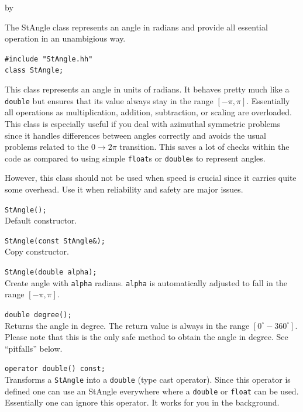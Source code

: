 \documentclass[twoside]{article}
\newcommand{\entrylabel}[1]{\mbox{\textbf{{#1}}}\hfil}%
\newenvironment{entry}
{\begin{list}{}%
    {\renewcommand{\makelabel}{\entrylabel}%
     \setlength{\labelwidth}{90pt}%
     \setlength{\leftmargin}{\labelwidth}
     \advance\leftmargin by \labelsep%
      }%
    }%
  {\end{list}}
\newcommand{\Entrylabel}[1]%
{\raisebox{0pt}[1ex][0pt]{\makebox[\labelwidth][l]%
    {\parbox[t]{\labelwidth}{\hspace{0pt}\textbf{{#1}}}}}}
\newenvironment{Entry}%
{\renewcommand{\entrylabel}{\Entrylabel}\begin{entry}}%
  {\end{entry}}
\begin{document}
\begin{Entry}
\item[Summary]
     The StAngle class represents an angle in radians and provide
     all essential operation in an unambigious way.
     
\item[Synopsis]
  \verb+#include "StAngle.hh"+ \\
  \verb+class StAngle;+\\
    
\item[Description]   
  This class represents an angle in units of radians. It behaves
  pretty much like a \texttt{double} but ensures that its value
  always stay in the range $[-\pi, \pi]$. Essentially all operations
  as multiplication, addition, subtraction, or scaling are overloaded.
  This class is especially useful if you deal with azimuthal symmetric
  problems since it handles differences between angles correctly and avoids
  the usual problems related to the $0 \rightarrow 2 \pi$ transition.
  This saves a lot of checks within the code as compared to using
  simple \texttt{float}s or \texttt{double}s to represent angles.

  However, this class should not be used when speed is crucial since
  it carries quite some overhead. Use it when reliability and safety
  are major issues.

\item[Public\\ Constructors]
    \verb+StAngle();+\\
    Default constructor. 
    
    \verb+StAngle(const StAngle&);+\\
    Copy constructor. 
    
    \verb+StAngle(double alpha);+\\
    Create angle with \texttt{alpha} radians. \texttt{alpha} is automatically
    adjusted to fall in the range $[-\pi, \pi]$.

    
\item[Public Member\\ Functions]
    \verb+double degree();+\\
    Returns the angle in degree. The return value is always in the range
    $[0^\circ - 360^\circ]$. Please note that this is the only safe method
    to obtain the angle in degree. See ``pitfalls'' below.

\item[Public Member\\ Operators]
    \verb+operator double() const;+\\
    Transforms a \texttt{StAngle} into a \texttt{double} (type cast operator).
    Since this operator is defined one can use an StAngle everywhere where a
    \texttt{double} or \texttt{float} can be used.
    Essentially one can ignore this operator. It works for you in the background.


\end{Entry}
\end{document}
